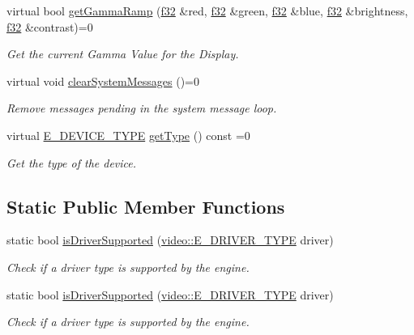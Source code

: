 \begin{DoxyCompactItemize}
virtual bool \hyperlink{classirr_1_1IrrlichtDevice_a30c4e1716271600a88e0ca07ca030f9b}{get\+Gamma\+Ramp} (\hyperlink{namespaceirr_a0277be98d67dc26ff93b1a6a1d086b07}{f32} \&red, \hyperlink{namespaceirr_a0277be98d67dc26ff93b1a6a1d086b07}{f32} \&green, \hyperlink{namespaceirr_a0277be98d67dc26ff93b1a6a1d086b07}{f32} \&blue, \hyperlink{namespaceirr_a0277be98d67dc26ff93b1a6a1d086b07}{f32} \&brightness, \hyperlink{namespaceirr_a0277be98d67dc26ff93b1a6a1d086b07}{f32} \&contrast)=0
\begin{DoxyCompactList}\small\item\em Get the current Gamma Value for the Display. \end{DoxyCompactList}\item 
virtual void \hyperlink{classirr_1_1IrrlichtDevice_aa10c6151a267d8a1500d5dc7b44425dd}{clear\+System\+Messages} ()=0
\begin{DoxyCompactList}\small\item\em Remove messages pending in the system message loop. \end{DoxyCompactList}\item 
virtual \hyperlink{namespaceirr_ac25d94cf2e1037c7ca18ee79b3bd4505}{E\+\_\+\+D\+E\+V\+I\+C\+E\+\_\+\+T\+Y\+PE} \hyperlink{classirr_1_1IrrlichtDevice_a2a2ec439b1f153169003c4d3e986a7d7}{get\+Type} () const =0
\begin{DoxyCompactList}\small\item\em Get the type of the device. \end{DoxyCompactList}\end{DoxyCompactItemize}
\subsection*{Static Public Member Functions}
\begin{DoxyCompactItemize}
\item 
static bool \hyperlink{classirr_1_1IrrlichtDevice_a5a74995aec731b26c6a9cb5bea6842fe}{is\+Driver\+Supported} (\hyperlink{namespaceirr_1_1video_ae35a6de6d436c76107ad157fe42356d0}{video\+::\+E\+\_\+\+D\+R\+I\+V\+E\+R\+\_\+\+T\+Y\+PE} driver)
\begin{DoxyCompactList}\small\item\em Check if a driver type is supported by the engine. \end{DoxyCompactList}\item 
static bool \hyperlink{classirr_1_1IrrlichtDevice_a5a74995aec731b26c6a9cb5bea6842fe}{is\+Driver\+Supported} (\hyperlink{namespaceirr_1_1video_ae35a6de6d436c76107ad157fe42356d0}{video\+::\+E\+\_\+\+D\+R\+I\+V\+E\+R\+\_\+\+T\+Y\+PE} driver)
\begin{DoxyCompactList}\small\item\em Check if a driver type is supported by the engine. \end{DoxyCompactList}\end{DoxyCompactItemize}
